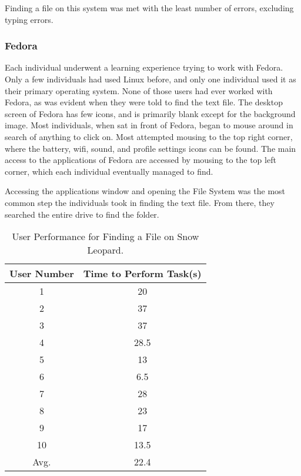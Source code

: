 \documentclass[11pt,letterpaper]{report}
\begin{document}
Finding a file on this system was met with the least number of errors, excluding typing errors. 

\subsubsection{Fedora}
Each individual underwent a learning experience trying to work with Fedora. Only a few individuals had used Linux before, and only one individual used it as their primary operating system. None of those users had ever worked with Fedora, as was evident when they were told to find the text file. The desktop screen of Fedora has few icons, and is primarily blank except for the background image. Most individuals, when sat in front of Fedora, began to mouse around in search of anything to click on. Most attempted mousing to the top right corner, where the battery, wifi, sound, and profile settings icons can be found. The main access to the applications of Fedora are accessed by mousing to the top left corner, which each individual eventually managed to find. 

Accessing the applications window and opening the File System was the most common step the individuals took in finding the text file. From there, they searched the entire drive to find the folder. 

\begin{table}[h!]
    \centering
    \begin{tabular}{| c | c |}
        \hline
        User Number & Time to Perform Task(s) \\ \hline
        1 & 20 \\  \hline
        2 & 37 \\  \hline
        3 & 37 \\ \hline
        4 & 28.5 \\  \hline
        5 & 13 \\    \hline
        6 & 6.5 \\  \hline
        7 & 28 \\ \hline
        8 & 23 \\  \hline
        9 & 17 \\ \hline
        10 & 13.5 \\ \hline
        Avg. & 22.4 \\
        \hline
    \end{tabular}
    \caption{User Performance for Finding a File on Snow Leopard.}
    \label{fafM}
\end{table}
\end{document}
